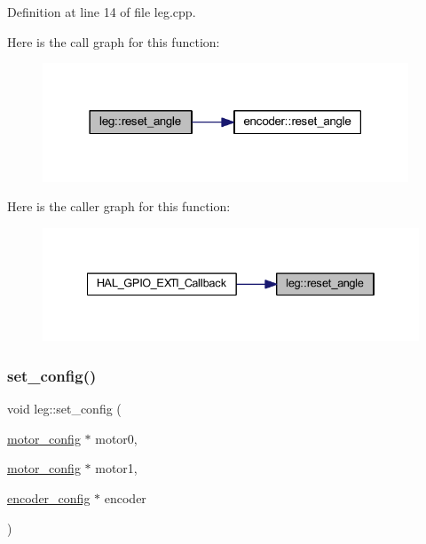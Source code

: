 Definition at line 14 of file leg.\+cpp.

Here is the call graph for this function\+:
\nopagebreak
\begin{figure}[H]
\begin{center}
\leavevmode
\includegraphics[width=309pt]{classleg_add86097d69f6780c1c651693aac6fa4e_cgraph}
\end{center}
\end{figure}
Here is the caller graph for this function\+:
\nopagebreak
\begin{figure}[H]
\begin{center}
\leavevmode
\includegraphics[width=334pt]{classleg_add86097d69f6780c1c651693aac6fa4e_icgraph}
\end{center}
\end{figure}
\mbox{\label{classleg_aee2ceb15630cf35d5bc69959da270e51}} 
\subsubsection{\texorpdfstring{set\_config()}{set\_config()}}
{\footnotesize\ttfamily void leg\+::set\+\_\+config (\begin{DoxyParamCaption}\item[{\mbox{\hyperlink{structmotor__config}{motor\+\_\+config}} $\ast$}]{motor0,  }\item[{\mbox{\hyperlink{structmotor__config}{motor\+\_\+config}} $\ast$}]{motor1,  }\item[{\mbox{\hyperlink{structencoder__config}{encoder\+\_\+config}} $\ast$}]{encoder }\end{DoxyParamCaption})\hspace{0.3cm}{\ttfamily [inline]}}



